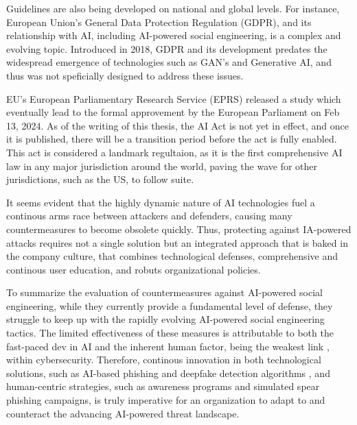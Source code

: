 Guidelines are also being developed on national and global levels. For instance, European Union's General Data Protection Regulation (GDPR), and its relationship with AI, including AI-powered social engineering, is a complex and evolving topic. Introduced in 2018, GDPR and its development predates the widespread emergence of technologies such as GAN's and Generative AI\citep{goodfellowGenerativeAdversarialNetworks2020}, and thus was not speficially designed to address these issues.

EU's European Parliamentary Research Service (EPRS) released a study\citep{eprsTheImpactofTheGDPR2020} which eventually lead to the formal approvement by the European Parliament on Feb 13, 2024. As of the writing of this thesis, the AI Act is not yet in effect, and once it is published, there will be a transition period before the act is fully enabled. This act is considered a landmark regultaion, as it is the first comprehensive AI law in any major jurisdiction around the world, paving the wave for other jurisdictions, such as the US,  to follow suite.

It seems evident that the highly dynamic nature of AI technologies fuel a continous arms race between attackers and defenders, causing many countermeasures to become obsolete quickly. Thus, protecting against IA-powered attacks requires not a single solution but an integrated approach that is baked in the company culture, that combines technological defenses, comprehensive and continous user education, and robuts organizational policies.

To summarize the evaluation of countermeasures against AI-powered social engineering, while they currently provide a fundamental level of defense, they struggle to keep up with the rapidly evolving AI-powered social engineering tactics. The limited effectiveness of these measures is attributable to both the fast-paced dev in AI and the inherent human factor, being the weakest link \citep{mitnickArtDeceptionControlling2003}, within cybersecurity. Therefore, continous innovation in both technological solutions, such as AI-based phishing and deepfake detection algorithms \citep{mirskyTheCreationAndDetectionOfDeepfakes2021}, and human-centric strategies, such as awareness programs \citep{salahdineSocialEngineeringAttacks2019} and simulated spear phishing campaigns, is truly imperative for an organization to adapt to and counteract the advancing AI-powered threat landscape.